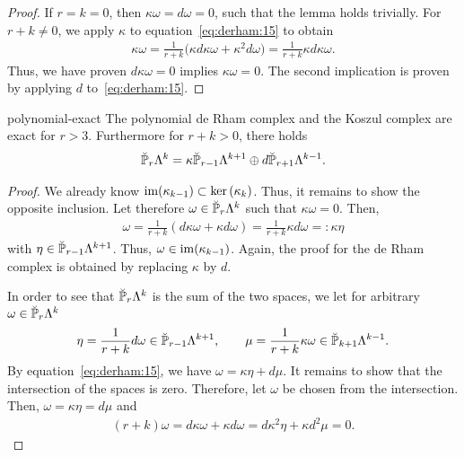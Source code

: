 \begin{proof}
  If $r=k=0$, then $\kappa\omega = d\omega = 0$, such that the lemma
  holds trivially. For $r+k\neq 0$, we apply $\kappa$ to
  equation~\eqref{eq:derham:15} to obtain
  \begin{gather*}
    \kappa\omega = \frac1{r+k}
    \bigl(\kappa d\kappa\omega + \kappa^2d\omega\bigr)
    = \frac1{r+k}\kappa d\kappa\omega.
  \end{gather*}
  Thus, we have proven $d\kappa\omega=0$ implies $\kappa\omega=0$. The
  second implication is proven by applying $d$ to~\eqref{eq:derham:15}.
\end{proof}

\begin{Theorem}{polynomial-exact}
  The polynomial de Rham complex and the Koszul complex are exact for
  $r>3$. Furthermore for $r+k>0$, there holds
  \begin{gather}
    \label{eq:derham:17}
    \breve \P_r\Lambda^k = \kappa \breve\P_{r-1}\Lambda^{k+1}
    \oplus d\breve\P_{r+1}\Lambda^{k-1}.
  \end{gather}
\end{Theorem}

\begin{proof}
  We already know $\range{\kappa_{k-1}} \subset \ker{\kappa_k}$. Thus,
  it remains to show the opposite inclusion. Let therefore $\omega\in
  \breve \P_r\Lambda^k$ such that $\kappa\omega=0$. Then,
  \begin{gather*}
    \omega = \frac1{r+k} (d\kappa\omega+\kappa d\omega)
    = \frac1{r+k} \kappa d\omega =: \kappa\eta
  \end{gather*}
  with $\eta \in \breve\P_{r-1}\Lambda^{k+1}$. Thus,
  $\omega\in \range{\kappa_{k-1}}$. Again, the proof for the de Rham
  complex is obtained by replacing $\kappa$ by $d$.

  In order to see that $\breve \P_r\Lambda^k$ is the sum of the two
  spaces, we let for arbitrary $\omega\in \breve \P_r\Lambda^k$
  \begin{gather*}
    \eta = \frac1{r+k} d\omega \in \breve\P_{r-1}\Lambda^{k+1},
    \qquad
    \mu = \frac1{r+k} \kappa\omega \in \breve\P_{k+1}\Lambda^{k-1}.
  \end{gather*}
  By equation~\eqref{eq:derham:15}, we have
  $\omega = \kappa\eta + d\mu$. It remains to show that the
  intersection of the spaces is zero. Therefore, let $\omega$ be
  chosen from the intersection. Then, $\omega = \kappa\eta = d \mu$
  and
  \begin{gather*}
    (r+k)\omega = d\kappa \omega + \kappa d \omega
    = d \kappa^2 \eta + \kappa d^2 \mu = 0.
  \end{gather*}
\end{proof}


